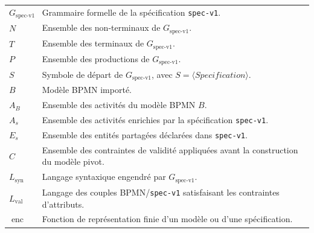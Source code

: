 \begingroup
\setlength{\tabcolsep}{4pt}
\renewcommand{\arraystretch}{1.05}
\setlength{\LTleft}{0pt}
\setlength{\LTright}{0pt}

\begin{longtable}{@{}p{5cm}p{9cm}@{}}
$G_{\text{spec-v1}}$ & Grammaire formelle de la spécification \texttt{spec-v1}.\\
$N$ & Ensemble des non-terminaux de $G_{\text{spec-v1}}$.\\
$T$ & Ensemble des terminaux de $G_{\text{spec-v1}}$.\\
$P$ & Ensemble des productions de $G_{\text{spec-v1}}$.\\
$S$ & Symbole de départ de $G_{\text{spec-v1}}$, avec $S=\langle Specification\rangle$.\\
$B$ & Modèle BPMN importé.\\
$A_B$ & Ensemble des activités du modèle BPMN $B$.\\
$A_s$ & Ensemble des activités enrichies par la spécification \texttt{spec-v1}.\\
$E_s$ & Ensemble des entités partagées déclarées dans \texttt{spec-v1}.\\
$C$ & Ensemble des contraintes de validité appliquées avant la construction du modèle pivot.\\
$L_{\mathrm{syn}}$ & Langage syntaxique engendré par $G_{\text{spec-v1}}$.\\
$L_{\mathrm{val}}$ & Langage des couples BPMN/\texttt{spec-v1} satisfaisant les contraintes d'attributs.\\
$\operatorname{enc}$ & Fonction de représentation finie d'un modèle ou d'une spécification.\\
\end{longtable}
\endgroup
